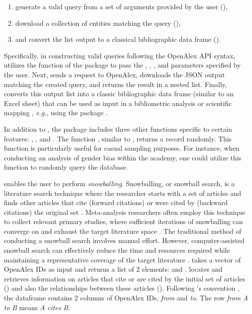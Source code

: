 \begin{enumerate}
  \item generate a valid query from a set of arguments provided by the user (), 
  \item download a collection of entities matching the query (),
  \item and convert the list output to a classical bibliographic data frame ().
\end{enumerate}

Specifically, in constructing valid queries following the OpenAlex API syntax,  utilizes the  function of the  package \citep{hadley2022httr} to pass the , , , and  parameters specified by the user.
Next,  sends a request to OpenAlex, downloads the JSON output matching the created query, and returns the result in a nested list.
Finally,  converts this output list into a classic bibliographic data frame (similar to an Excel sheet) that can be used as input in a bibliometric analysis or scientific mapping \citep{wais2016gender}, \emph{e.g.}, using the  package \citep{aria2017bibliometrix}. 

In addition to , the package  includes three other functions specific to certain features: , , and . 
The function  , similar to , returns a record randomly. This function is particularly useful for casual sampling purposes. For instance, when conducting an analysis of gender bias within the academy, one could utilize this function to randomly query the database.

 enables the user to perform \emph{snowballing}. 
Snowballing, or snowball search, is a literature search technique where the researcher starts with a set of articles and finds other articles that cite (forward citations) or were cited by (backward citations) the original set \citep{wohlin2014guidelines}.
Meta-analysis researchers often employ this technique to collect relevant primary studies, where sufficient iterations of snowballing can converge on and exhaust the target literature space \citep{siddaway2019systemicreview}.
The traditional method of conducting a snowball search involves manual effort.
However, computer-assisted snowball search can effectively reduce the time and resources required while maintaining a representative coverage of the target literature \citep{snowglobe, mcweeny2022rapid}.
 takes a vector of OpenAlex IDs as input and returns a list of 2 elements:  and .
 locates and retrieves information on articles that cite or are cited by the initial set of articles () and also the relationships between these articles ().
Following 's convention \citep{tidygraph}, the  dataframe contains 2 columns of OpenAlex IDs, \emph{from} and \emph{to}. 
The row \emph{from A to B} means \emph{A cites B}.

